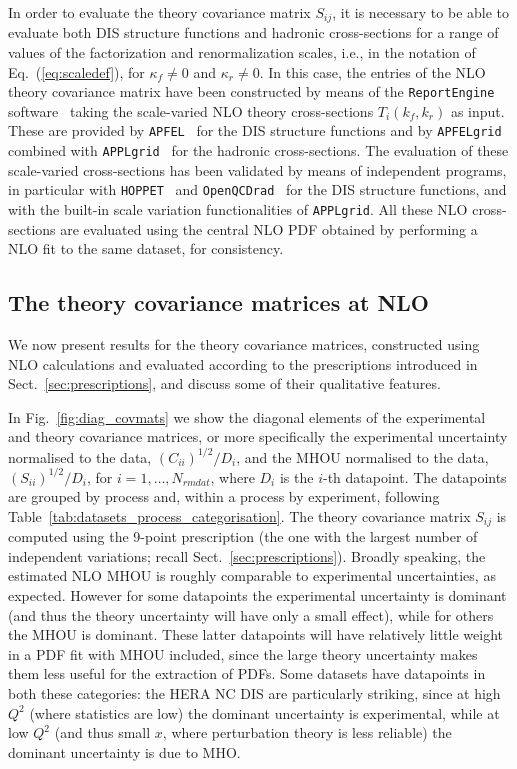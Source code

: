 In order to evaluate the theory covariance matrix $S_{ij}$, it is necessary
to be able to evaluate both DIS structure functions and hadronic
cross-sections for a range of values of the factorization
and renormalization scales, i.e., in the notation of Eq.~(\ref{eq:scaledef}), for $\kappa_f\ne 0$ and $\kappa_r\ne 0$.
%
In this case, the entries of the NLO theory covariance matrix have been 
constructed
by means of the {\tt ReportEngine} software~\cite{zahari_kassabov_2019_2571601}
taking the
scale-varied NLO theory cross-sections $T_i(k_f,k_r)$  as input.
%
These are provided 
by {\tt APFEL}~\cite{Bertone:2013vaa} for the DIS structure functions
and by {\tt APFELgrid}~\cite{Bertone:2016lga} combined with
{\tt APPLgrid}~\cite{Carli:2010rw} for the hadronic
cross-sections.
%
The evaluation of these scale-varied cross-sections has been validated
by means of independent programs, in particular with {\tt HOPPET}~\cite{Salam:2008qg}
and {\tt OpenQCDrad}~\cite{Alekhin:2012ig}
for the DIS structure functions, and with the built-in scale variation
functionalities of {\tt APPLgrid}. All these NLO cross-sections are evaluated using the central NLO PDF obtained by performing a NLO fit to the same dataset, for consistency.

\subsection{The theory covariance matrices at NLO}
\label{sec:nlothcov}

We now present results for the
theory covariance matrices, constructed using NLO calculations
and evaluated according to the prescriptions
introduced in Sect.~\ref{sec:prescriptions}, and discuss some of their
qualitative features.

In Fig.~\ref{fig:diag_covmats} we show the diagonal elements of 
the experimental and theory covariance matrices, or more specifically 
the experimental uncertainty normalised to the data, $(C_{ii})^{1/2}/D_i$, and 
the MHOU normalised to the data, $(S_{ii})^{1/2}/D_i$, for $i=1,\ldots,N_{rm dat}$, where $D_i$ is the $i$-th datapoint. 
The datapoints are grouped by process and, within a 
process by experiment, following 
Table~\ref{tab:datasets_process_categorisation}. The theory covariance matrix $S_{ij}$ is computed using the 9-point prescription (the one with the largest number of independent variations; recall
Sect.~\ref{sec:prescriptions}). Broadly speaking, the estimated NLO MHOU is roughly comparable to experimental uncertainties, as expected. 
However for some datapoints the 
experimental uncertainty is dominant (and thus the theory uncertainty
will have only a small effect), while for others the MHOU is
dominant. These latter datapoints will have relatively little weight
in a PDF fit with MHOU included, since the large theory uncertainty
makes them less useful for the extraction of PDFs. Some datasets have
datapoints in both these categories: the HERA NC DIS are particularly
striking, since at high $Q^2$ (where statistics are low) the dominant
uncertainty is experimental, while at low $Q^2$ (and thus small $x$,
where perturbation theory is less reliable) the dominant uncertainty
is due to MHO.  

